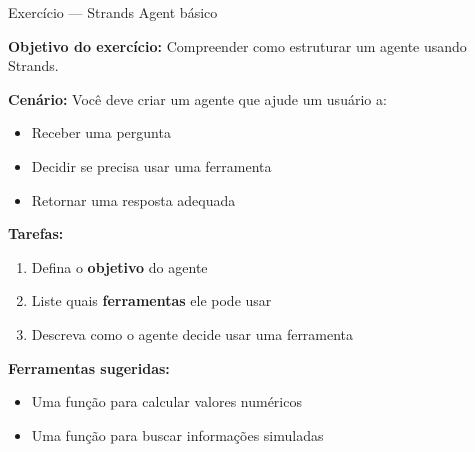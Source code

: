 \documentclass{beamer}
\begin{document}
\begin{frame}{Exercício — Strands Agent básico}
    
    \textbf{Objetivo do exercício:}  
    Compreender como estruturar um agente usando Strands.
    
    \vspace{0.3cm}
    
    \textbf{Cenário:}  
    Você deve criar um agente que ajude um usuário a:
    \begin{itemize}
        \item Receber uma pergunta
        \item Decidir se precisa usar uma ferramenta
        \item Retornar uma resposta adequada
    \end{itemize}
    
    \vspace{0.3cm}
    
    \textbf{Tarefas:}
    \begin{enumerate}
        \item Defina o \textbf{objetivo} do agente
        \item Liste quais \textbf{ferramentas} ele pode usar
        \item Descreva como o agente decide usar uma ferramenta
    \end{enumerate}
    
    \vspace{0.3cm}
    
    \textbf{Ferramentas sugeridas:}
    \begin{itemize}
        \item Uma função para calcular valores numéricos
        \item Uma função para buscar informações simuladas
    \end{itemize}
    
\end{frame}
\end{document}
